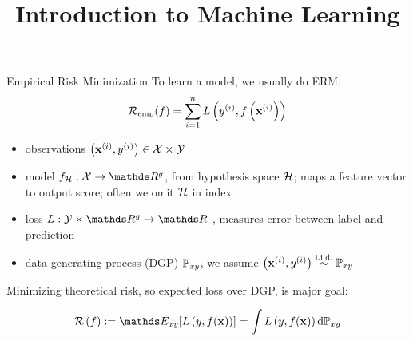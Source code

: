 \documentclass[11pt,compress,t,notes=noshow, xcolor=table]{beamer}
\title{Introduction to Machine Learning}
\begin{document}
    

\begin{vbframe}{Empirical Risk Minimization}
To learn a model, we usually do ERM:
\vspace{-0.3cm}
$$\mathcal{R}_{\text{emp}}(f) = \sum\limits_{i=1}^n L\left(y^{(i)}, f\left(\mathbf{x}^{(i)}\right)\right)$$
\vspace{-0.2cm}
{\small
\begin{itemize}\setlength\itemsep{0.5pt} 
    \item observations $\left(\mathbf{x}^{(i)}, y^{(i)}\right) \in  \mathcal{X} \times \mathcal{Y}$
    \item model $f_{\Hspace}:\Xspace \rightarrow \R^g$, 
    from hypothesis space $\mathcal{H}$;
    maps a feature vector to output score;
    often we omit $\mathcal{H}$ in index 
    \item loss $L:\Yspace\times\R^g\rightarrow\R$ ,
    measures error between label and prediction
    \item data generating process (DGP) $\mathbb{P}_{xy}$, we assume %
    $\left(\mathbf{x}^{(i)}, y^{(i)}\right)  \overset{\text{i.i.d.}}{\sim} \mathbb{P}_{xy}$    
\end{itemize}
}
Minimizing theoretical risk, so expected loss over DGP, is major goal:

$$ \risk \left(f\right) := \E_{xy} [\Lxy] = \int \Lxy \text{d}\Pxy $$
\end{vbframe}
\end{document}
